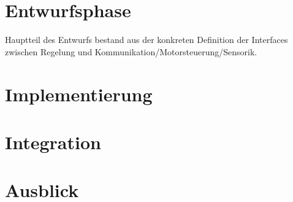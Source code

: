\section{Entwurfsphase}
Hauptteil des Entwurfs bestand aus der konkreten Definition der Interfaces zwischen Regelung und Kommunikation/Motorsteuerung/Sensorik.
\section{Implementierung}
\section{Integration}
\section{Ausblick}

